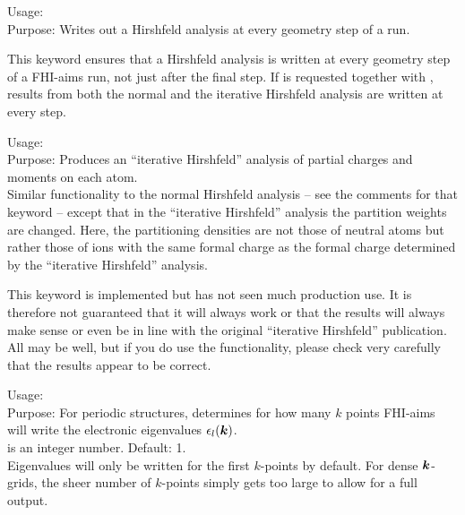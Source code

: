 {
  \noindent
  Usage:   \\[1.0ex]
  Purpose: Writes out a Hirshfeld analysis at every geometry step of a run. \\[1.0ex]
}

This keyword ensures that a Hirshfeld analysis is written at every
geometry step of a FHI-aims run, not just after the final step. 
If   is requested
together with  ,
results from both the normal and the iterative Hirshfeld analysis are
written at every step.

{
  \noindent
  Usage:   \\[1.0ex]
  Purpose: Produces an ``iterative Hirshfeld'' analysis of partial charges and
    moments on each atom. \\[1.0ex]
}
Similar functionality to the normal 
 Hirshfeld analysis -- see the comments
for that keyword -- except that in the ``iterative Hirshfeld'' \cite{Bultinck07}
analysis the partition weights are changed. Here, the partitioning
densities are not those of neutral atoms but rather those of ions with
the same formal charge as the formal charge determined by the
``iterative Hirshfeld'' analysis.

This keyword is implemented but has not seen much production use. It
is therefore not guaranteed that it will always work or that the
results will always make sense or even be in line with the original
``iterative Hirshfeld'' publication.\cite{Bultinck07} All may be well, but if you do
use the functionality, please check very carefully that the results
appear to be correct.

{
  \noindent
  Usage:  
   \\[1.0ex]
  Purpose: For periodic structures, determines for how many $k$ points
    FHI-aims will write the electronic eigenvalues
    $\epsilon_l(\mbox{\boldmath$k$})$. \\[1.0ex]
   is an integer number. Default: 1. \\
}
Eigenvalues will only be written for the first 
$k$-points by default. For dense $\mbox{\boldmath$k$}$-grids, the sheer number of
$k$-points simply gets too large to allow for a full output.

